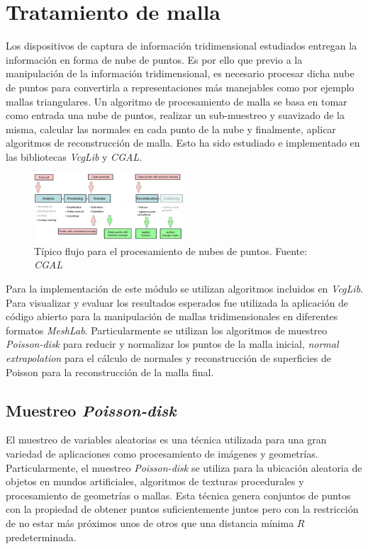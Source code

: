 \section{Tratamiento de malla}

Los dispositivos de captura de información tridimensional estudiados entregan la información en forma de nube de puntos. Es por ello que previo a la manipulación de la información tridimensional, es necesario procesar dicha nube de puntos para convertirla a representaciones más manejables como por ejemplo mallas triangulares.
Un algoritmo de procesamiento de malla se basa en tomar como entrada una nube de puntos, realizar un sub-muestreo y suavizado de la misma, calcular las normales en cada punto de la nube y finalmente, aplicar algoritmos de reconstrucción de malla. Esto ha sido estudiado e implementado en las bibliotecas \emph{VcgLib}\cite{VCGLib} y \emph{CGAL}\cite{CGAL}.

\begin{figure}[H]
  \centering
    \includegraphics[width=0.5\textwidth]{./Cap6_reconstruccion/malla-flow.png}
  \caption{Típico flujo para el procesamiento de nubes de puntos. Fuente: \emph{CGAL}}
  \label{fig:Mesh-CGAL}
\end{figure}

Para la implementación de este módulo se utilizan algoritmos incluidos en \emph{VcgLib}. Para visualizar y evaluar los resultados esperados fue utilizada la aplicación de código abierto para la manipulación de mallas tridimensionales en diferentes formatos \emph{MeshLab}\cite{MeshLab}. Particularmente se utilizan los algoritmos de muestreo \emph{Poisson-disk} para reducir y normalizar los puntos de la malla inicial, \emph{normal extrapolation} para el cálculo de normales y reconstrucción de superficies de Poisson para la reconstrucción de la malla final.

\subsection{Muestreo \emph{Poisson-disk}}

El muestreo de variables aleatorias es una técnica utilizada para una gran variedad de aplicaciones como procesamiento de imágenes y geometrías. Particularmente, el muestreo \emph{Poisson-disk} se utiliza para la ubicación aleatoria de objetos en mundos artificiales, algoritmos de texturas procedurales y procesamiento de geometrías o mallas.%
Esta técnica genera conjuntos de puntos con la propiedad de obtener puntos suficientemente juntos pero con la restricción de no estar más próximos unos de otros que una distancia mínima $R$ predeterminada.

